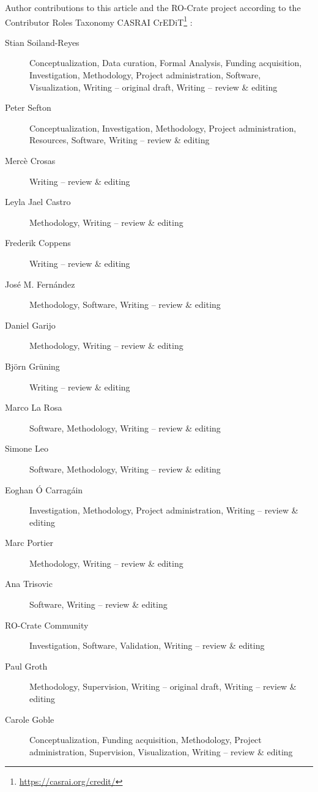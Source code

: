 \documentclass[ds,v1.1.2,openaccess]{iosart2x}%
\begin{document}
Author contributions to this article and the RO-Crate project according
to the Contributor Roles Taxonomy CASRAI
CrEDiT\footnote{\url{https://casrai.org/credit/}} \cite{doi:10.1087/20150211}:
\begin{description}
\item[Stian Soiland-Reyes]  Conceptualization, Data curation, Formal Analysis, Funding
acquisition, Investigation, Methodology, Project administration,
Software, Visualization, Writing -- original draft, Writing -- review
\& editing

\item[Peter Sefton]  Conceptualization, Investigation, Methodology, Project
administration, Resources, Software, Writing -- review \& editing

\item[Merc\`{e} Crosas]  Writing -- review \& editing

\item[Leyla Jael Castro]  Methodology, Writing -- review \& editing

\item[Frederik Coppens]  Writing -- review \& editing

\item[Jos\'{e} M. Fern\'{a}ndez]  Methodology, Software, Writing -- review \& editing

\item[Daniel Garijo]  Methodology, Writing -- review \& editing

\item[Bj\"{o}rn Gr\"{u}ning]  Writing -- review \& editing

\item[Marco La Rosa]  Software, Methodology, Writing -- review \& editing

\item[Simone Leo]  Software, Methodology, Writing -- review \& editing

\item[Eoghan \'{O} Carrag\'{a}in]  Investigation, Methodology, Project administration, Writing -- review
\& editing

\item[Marc Portier]  Methodology, Writing -- review \& editing

\item[Ana Trisovic]  Software, Writing -- review \& editing

\item[RO-Crate Community]  Investigation, Software, Validation, Writing -- review \& editing

\item[Paul Groth]  Methodology, Supervision, Writing -- original draft, Writing --
review \& editing

\item[Carole Goble]  Conceptualization, Funding acquisition, Methodology, Project
administration, Supervision, Visualization, Writing -- review \& editing
\end{description}
\end{document}
